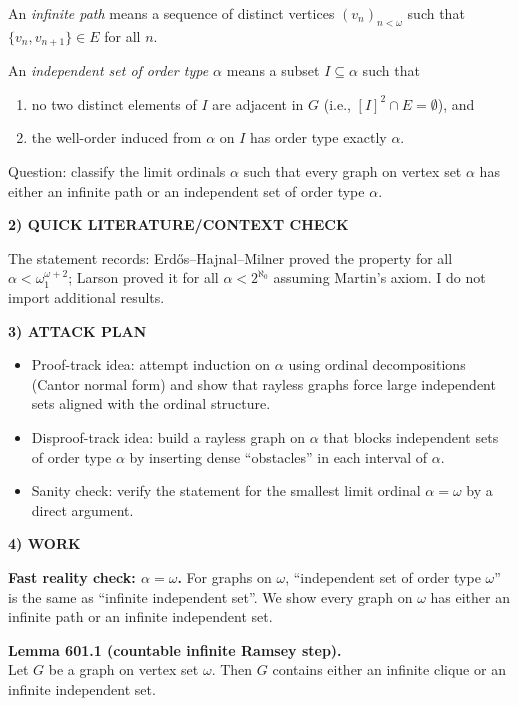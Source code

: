An \emph{infinite path} means a sequence of distinct vertices $(v_n)_{n<\omega}$ such that $\{v_n,v_{n+1}\}\in E$ for all $n$.

An \emph{independent set of order type $\alpha$} means a subset $I\subseteq\alpha$ such that
\begin{enumerate}
\item no two distinct elements of $I$ are adjacent in $G$ (i.e., $[I]^2\cap E=\emptyset$), and
\item the well-order induced from $\alpha$ on $I$ has order type exactly $\alpha$.
\end{enumerate}

Question: classify the limit ordinals $\alpha$ such that every graph on vertex set $\alpha$ has either an infinite path or an independent set of order type $\alpha$.

\noindent\textbf{2) QUICK LITERATURE/CONTEXT CHECK}\par
The statement records: Erd\H{o}s--Hajnal--Milner proved the property for all $\alpha<\omega_1^{\omega+2}$; Larson proved it for all $\alpha<2^{\aleph_0}$ assuming Martin's axiom. I do not import additional results.

\noindent\textbf{3) ATTACK PLAN}\par
\begin{itemize}
\item Proof-track idea: attempt induction on $\alpha$ using ordinal decompositions (Cantor normal form) and show that rayless graphs force large independent sets aligned with the ordinal structure.
\item Disproof-track idea: build a rayless graph on $\alpha$ that blocks independent sets of order type $\alpha$ by inserting dense ``obstacles'' in each interval of $\alpha$.
\item Sanity check: verify the statement for the smallest limit ordinal $\alpha=\omega$ by a direct argument.
\end{itemize}

\noindent\textbf{4) WORK}\par
\textbf{Fast reality check: $\alpha=\omega$.} For graphs on $\omega$, ``independent set of order type $\omega$'' is the same as ``infinite independent set''. We show every graph on $\omega$ has either an infinite path or an infinite independent set.

\medskip
\noindent\textbf{Lemma 601.1 (countable infinite Ramsey step).}\\
Let $G$ be a graph on vertex set $\omega$. Then $G$ contains either an infinite clique or an infinite independent set.

